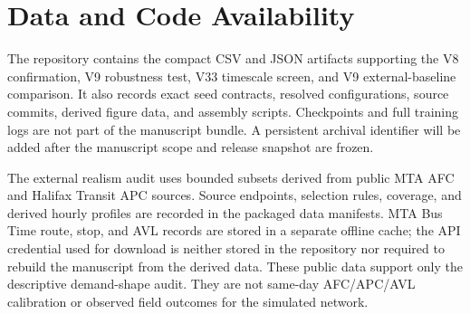 \documentclass[preprint,12pt,authoryear,nopreprintline]{elsarticle}
\begin{document}
\section{Data and Code Availability}\label{data-and-code-availability}

The repository contains the compact CSV and JSON artifacts supporting
the V8 confirmation, V9 robustness test, V33 timescale screen, and V9
external-baseline comparison. It also records exact seed contracts,
resolved configurations, source commits, derived figure data, and
assembly scripts. Checkpoints and full training logs are not part of the
manuscript bundle. A persistent archival identifier will be added after
the manuscript scope and release snapshot are frozen.

The external realism audit uses bounded subsets derived from public MTA
AFC and Halifax Transit APC sources. Source endpoints, selection rules,
coverage, and derived hourly profiles are recorded in the packaged data
manifests. MTA Bus Time route, stop, and AVL records are stored in a
separate offline cache; the API credential used for download is neither
stored in the repository nor required to rebuild the manuscript from the
derived data. These public data support only the descriptive
demand-shape audit. They are not same-day AFC/APC/AVL calibration or
observed field outcomes for the simulated network.

\begin{small}


\end{small}
\end{document}
